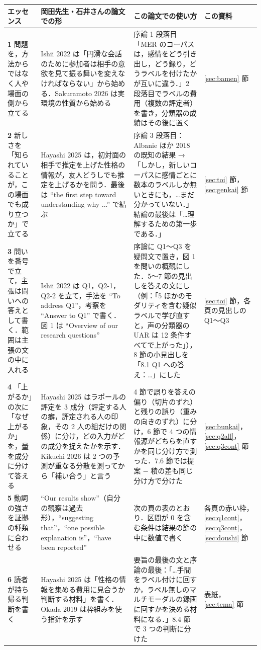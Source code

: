 \documentclass[a4paper,10pt]{ltjsarticle}
\begin{document}
\begin{center}
\footnotesize
\begin{tabular}{>{\raggedright}p{2.9cm}>{\raggedright}p{4.0cm}>{\raggedright}p{6.6cm}>{\raggedright\arraybackslash}p{2.1cm}}
\toprule
エッセンス & 岡田先生・石井さんの論文での形 & この論文での使い方 & この資料 \\
\midrule
\textbf{1} 問題を，方法からではなく人や場面の側から立てる & Ishii 2022 は「円滑な会話のために参加者は相手の意欲を見て振る舞いを変えなければならない」から始める．Sakuramoto 2026 は実環境の性質から始める & 序論 1 段落目「MER のコーパスは，感情をどう引き出し，どう録り，どうラベルを付けたかが互いに違う．」2 段落目でラベルの費用（複数の評定者）を書き，分類器の成績はその後に置く & \ref{sec:bamen} 節 \\
\textbf{2} 新しさを「知られていることが，この場面でも成り立つか」で立てる & Hayashi 2025 は，初対面の相手で推定を上げた性格の情報が，友人どうしでも推定を上げるかを問う．最後は ``the first step toward understanding why ...'' で結ぶ & 序論 3 段落目：Albanie ほか 2018 の既知の結果 →「しかし，新しいコーパスに感情ごとに数本のラベルしか無いときにも，…まだ分かっていない．」結論の最後は「…理解するための第一歩である．」 & \ref{sec:toi} 節，\ref{sec:genkai} 節 \\
\textbf{3} 問いを番号で立て，主張は問いへの答えとして書く．範囲は主張の文の中に入れる & Ishii 2022 は Q1，Q2-1，Q2-2 を立て，手法を ``To address Q1''，考察を ``Answer to Q1'' で書く．図 1 は ``Overview of our research questions'' & 序論に Q1〜Q3 を疑問文で置き，図 1 を問いの概観にした．5〜7 節の見出しを答えの文にし（例：「5 ほかのモダリティを含む疑似ラベルで学び直すと，声の分類器の UAR は 12 条件すべてで上がった」），8 節の小見出しを「8.1 Q1 への答え：…」にした & \ref{sec:toi} 節，各頁の見出しの Q1〜Q3 \\
\textbf{4} 「上がるか」の次に「なぜ上がるか」を，量を成分に分けて答える & Hayashi 2025 はラポールの評定を 3 成分（評定する人の癖，評定される人の印象，その 2 人の組だけの関係）に分け，どの入力がどの成分を捉えたかを示す．Kikuchi 2026 は 2 つの予測が重なる分散を測ってから「補い合う」と言う & 4 節で誤りを答えの偏り（切片のずれ）と残りの誤り（重みの向きのずれ）に分け，6 節で 4 つの情報源がどちらを直すかを同じ分け方で測った．7.6 節では提案 − 積の差も同じ分け方で分けた & \ref{sec:bunkai}，\ref{sec:q2all}，\ref{sec:q3cont} 節 \\
\textbf{5} 動詞の強さを証拠の種類に合わせる & ``Our results show''（自分の観察は過去形），``suggesting that''，``one possible explanation is''，``have been reported'' & 次の頁の表のとおり．区間が 0 を含む条件は結果の節の中に数値で書く & 各頁の赤い枠，\ref{sec:q1cont}，\ref{sec:q3cont}，\ref{sec:doushi} 節 \\
\textbf{6} 読者が持ち帰る判断を書く & Hayashi 2025 は「性格の情報を集める費用に見合うか判断する材料」を書く．Okada 2019 は枠組みを使う指針を示す & 要旨の最後の文と序論の最後：「…手間をラベル付けに回すか，ラベル無しのマルチモーダルの録画に回すかを決める材料になる．」8.4 節で 3 つの判断に分けた & 表紙，\ref{sec:tema} 節 \\
\bottomrule
\end{tabular}
\end{center}
\end{document}

